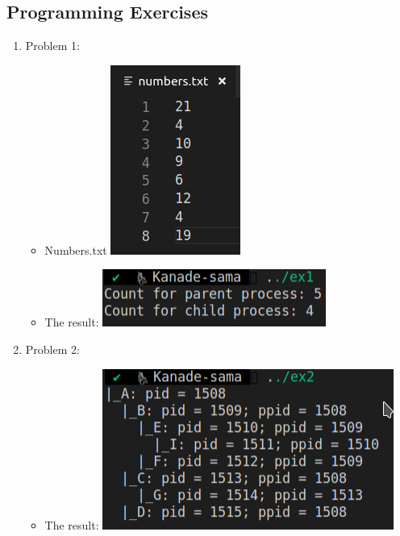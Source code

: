 \documentclass[a4paper]{article}
\begin{document}
\subsection{Programming Exercises}
\begin{enumerate}
    \item Problem 1: 
    \begin{itemize}
        \item Numbers.txt
        \bigbreak
        \includegraphics[scale = 0.5]{numbers.png}
        \bigbreak

        \item The result:
        \bigbreak
        \includegraphics[scale = 0.5]{problem1.png}
        \bigbreak
    \end{itemize}

    \item Problem 2:
    \begin{itemize}
        \item The result:
        \bigbreak
        \includegraphics[scale = 0.5]{problem2.png}
        \bigbreak
    \end{itemize}
\end{enumerate}
\end{document}
